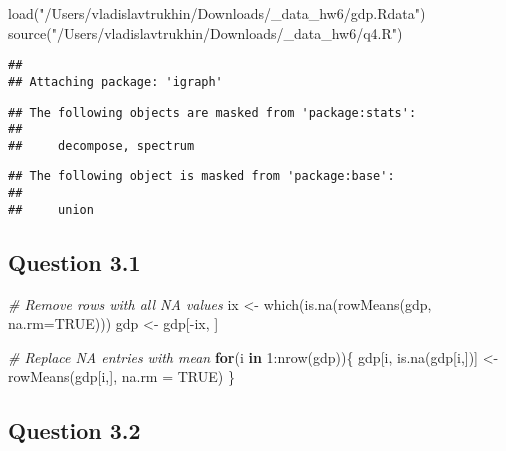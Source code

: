 \documentclass[
]{article}
\newenvironment{Shaded}{\begin{snugshade}}{\end{snugshade}}
\newcommand{\AttributeTok}[1]{\textcolor[rgb]{0.77,0.63,0.00}{#1}}
\newcommand{\CommentTok}[1]{\textcolor[rgb]{0.56,0.35,0.01}{\textit{#1}}}
\newcommand{\ConstantTok}[1]{\textcolor[rgb]{0.00,0.00,0.00}{#1}}
\newcommand{\ControlFlowTok}[1]{\textcolor[rgb]{0.13,0.29,0.53}{\textbf{#1}}}
\newcommand{\DecValTok}[1]{\textcolor[rgb]{0.00,0.00,0.81}{#1}}
\newcommand{\FunctionTok}[1]{\textcolor[rgb]{0.00,0.00,0.00}{#1}}
\newcommand{\NormalTok}[1]{#1}
\newcommand{\OtherTok}[1]{\textcolor[rgb]{0.56,0.35,0.01}{#1}}
\newcommand{\SpecialCharTok}[1]{\textcolor[rgb]{0.00,0.00,0.00}{#1}}
\newcommand{\StringTok}[1]{\textcolor[rgb]{0.31,0.60,0.02}{#1}}
\begin{document}
\begin{Shaded}
\begin{Highlighting}[]
\FunctionTok{load}\NormalTok{(}\StringTok{"/Users/vladislavtrukhin/Downloads/\_data\_hw6/gdp.Rdata"}\NormalTok{)}
\FunctionTok{source}\NormalTok{(}\StringTok{"/Users/vladislavtrukhin/Downloads/\_data\_hw6/q4.R"}\NormalTok{)}
\end{Highlighting}
\end{Shaded}

\begin{verbatim}
## 
## Attaching package: 'igraph'
\end{verbatim}

\begin{verbatim}
## The following objects are masked from 'package:stats':
## 
##     decompose, spectrum
\end{verbatim}

\begin{verbatim}
## The following object is masked from 'package:base':
## 
##     union
\end{verbatim}

\hypertarget{question-3.1}{%
\subsection{Question 3.1}\label{question-3.1}}

\begin{Shaded}
\begin{Highlighting}[]
\CommentTok{\# Remove rows with all NA values}
\NormalTok{ix }\OtherTok{\textless{}{-}} \FunctionTok{which}\NormalTok{(}\FunctionTok{is.na}\NormalTok{(}\FunctionTok{rowMeans}\NormalTok{(gdp, }\AttributeTok{na.rm=}\ConstantTok{TRUE}\NormalTok{)))}
\NormalTok{gdp }\OtherTok{\textless{}{-}}\NormalTok{ gdp[}\SpecialCharTok{{-}}\NormalTok{ix, ]}

\CommentTok{\# Replace NA entries with mean}
\ControlFlowTok{for}\NormalTok{(i }\ControlFlowTok{in} \DecValTok{1}\SpecialCharTok{:}\FunctionTok{nrow}\NormalTok{(gdp))\{}
\NormalTok{  gdp[i, }\FunctionTok{is.na}\NormalTok{(gdp[i,])] }\OtherTok{\textless{}{-}} \FunctionTok{rowMeans}\NormalTok{(gdp[i,], }\AttributeTok{na.rm =} \ConstantTok{TRUE}\NormalTok{)}
\NormalTok{\}}
\end{Highlighting}
\end{Shaded}

\hypertarget{question-3.2}{%
\subsection{Question 3.2}\label{question-3.2}}
\end{document}
